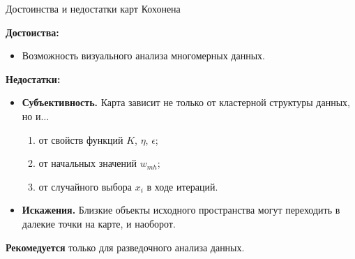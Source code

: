 \documentclass[unicode, notheorems, pdf]{beamer}
\begin{document}
\begin{frame}{Достоинства и недостатки карт Кохонена}

	\textbf{Достоиства:}
	\begin{itemize}
		\item Возможность визуального анализа многомерных данных.
	\end{itemize}

	\vspace{.5cm}
	\textbf{Недостатки:}
	\begin{itemize}
		\item {\bf Субъективность.} Карта зависит не только от кластерной структуры данных, но и$\dots$
		\begin{enumerate}[---]
			\item от свойств функций $K$, $\eta$, $\epsilon$;

			\item от начальных значений $w_{mh}$;

			\item от случайного выбора $x_i$ в ходе итераций.
		\end{enumerate}

		\item {\bf Искажения.} Близкие объекты исходного пространства могут переходить в далекие точки на карте, и наоборот.
	\end{itemize}

	\vspace{.5cm}
	{\bf Рекомедуется} только для разведочного анализа данных.
\end{frame}
% 
\end{document}
